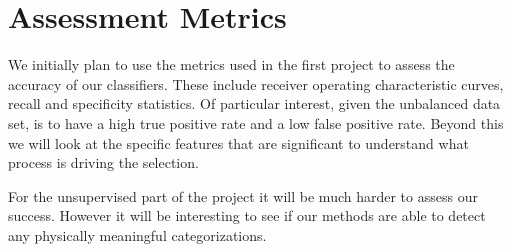 \section{Assessment Metrics}
We initially plan to use the metrics used in the first project to assess the accuracy of our classifiers. These include receiver operating characteristic  curves, recall and specificity statistics. Of particular interest, given the unbalanced data set, is to have a high true positive rate and a low false positive rate. Beyond this we will look at the specific features that are significant to understand what process is driving the selection.

For the unsupervised part of the project it will be much harder to assess our success. However it will be interesting to see if our methods are able to detect any physically meaningful categorizations.